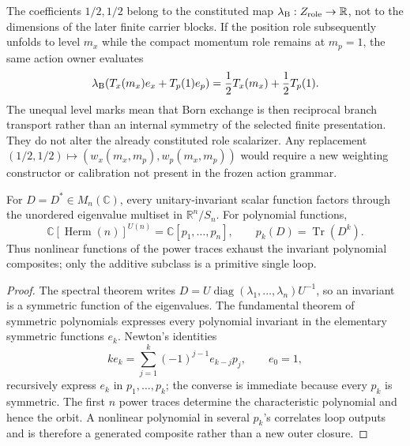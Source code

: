 \documentclass[12pt,a4paper]{article}
\begin{document}
\begin{remark}
\label{p3b:rem:role-scalarizer-unequal-level-persistence}
The coefficients \(1/2,1/2\) belong to the constituted map
\(\lambda_{\rm B}:Z_{\rm role}\to\mathbb R\), not to the dimensions of the
later finite carrier blocks.  If the position role subsequently unfolds to
level \(m_x\) while the compact momentum role remains at \(m_p=1\), the same
action owner evaluates
\[
 \lambda_{\rm B}\!\left(T_x(m_x)e_x+T_p(1)e_p\right)
 =\frac12T_x(m_x)+\frac12T_p(1).
\]
The unequal level marks mean that Born exchange is then reciprocal branch
transport rather than an internal symmetry of the selected finite
presentation.  They do not alter the already constituted role scalarizer.
Any replacement \((1/2,1/2)\mapsto(w_x(m_x,m_p),w_p(m_x,m_p))\) would require
a new weighting constructor or calibration not present in the frozen action
grammar.
\end{remark}


\begin{theorem}
\label{p3:thm:invariant-spectral-composite-exhaustion}
For \(D=D^*\in M_n(\mathbb C)\), every unitary-invariant scalar function
factors through the unordered eigenvalue multiset in \(\mathbb R^n/S_n\).
For polynomial functions,
\[
 \boxed{
 \mathbb C[\operatorname{Herm}(n)]^{U(n)}
 =\mathbb C[p_1,\ldots,p_n],
 \qquad p_k(D)=\operatorname{Tr}(D^k).}
\]
Thus nonlinear functions of the power traces exhaust the invariant polynomial
composites; only the additive subclass is a primitive single loop.
\end{theorem}

\begin{proof}
The spectral theorem writes
\(D=U\operatorname{diag}(\lambda_1,\ldots,\lambda_n)U^{-1}\), so an
invariant is a symmetric function of the eigenvalues.  The fundamental
theorem of symmetric polynomials expresses every polynomial invariant in the
elementary symmetric functions \(e_k\).  Newton's identities
\[
 k e_k=\sum_{j=1}^k(-1)^{j-1}e_{k-j}p_j,
 \qquad e_0=1,
\]
recursively express \(e_k\) in \(p_1,\ldots,p_k\); the converse is immediate
because every \(p_k\) is symmetric.  The first \(n\) power traces determine
the characteristic polynomial and hence the orbit.  A nonlinear polynomial
in several \(p_k\)'s correlates loop outputs and is therefore a generated
composite rather than a new outer closure.
\end{proof}
\end{document}
